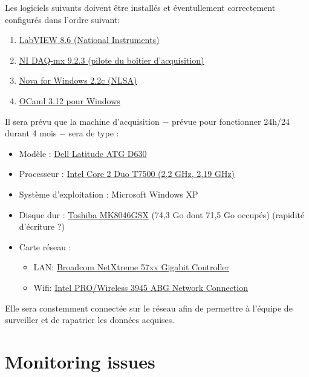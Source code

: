 \documentclass[a4paper]{report}
\begin{document}
Les logiciels suivants doivent \^etre install\'es et \'eventullement correctement configur\'es dans l'ordre\cite{NI_driver} suivant:
\begin{enumerate}
  \item{\href{http://digital.ni.com/src.nsf/websearch/968B3DF8AD48394D86257880005141A8?OpenDocument&node=node=203014_us}{LabVIEW 8.6 (National Instruments)}}
  \item{\href{http://joule.ni.com/nidu/cds/view/p/id/2260/lang/fr}{NI DAQ-mx 9.2.3 (pilote du bo\^itier d'acquisition)}}
  \item{\href{http://www.nlsa.com/uploads/nfw21v/nova_21v_download.html}{Nova for Windows 2.2c (NLSA)}}
  \item{\href{http://protz.github.com/ocaml-installer/}{OCaml 3.12 pour Windows}}
\end{enumerate}

Il sera pr\'evu que la machine d'acquisition $-$ pr\'evue pour fonctionner 24h/24 durant 4 mois $-$ sera de type :
\begin{itemize}
  \item{Mod\`ele : \href{http://support.dell.com/support/edocs/systems/latd630a/en/sm/index.htm}{Dell Latitude ATG D630}}
  \item{Processeur : \href{http://ark.intel.com/products/29761/Intel-Core2-Duo-Processor-T7500-\%284M-Cache-2_20-GHz-800-MHz-FSB\%29}{Intel Core 2 Duo T7500 (2,2 GHz, 2,19 GHz)}}
  \item{Syst\`eme d'exploitation : Microsoft Windows XP}
  \item{Disque dur : \href{http://storage.toshiba.com/storagesolutions/archived-models/mk8046gsx}{Toshiba MK8046GSX} (74,3 Go dont 71,5 Go occup\'es) (rapidit\'e d'\'ecriture ?)}
  \item{Carte r\'eseau :
    \begin{itemize}
      \item{LAN: \href{http://www.broadcom.com/support/ethernet_nic/netlink_k57.php}{Broadcom NetXtreme 57xx Gigabit Controller}}
      \item{Wifi: \href{http://www.intel.com/products/wireless/prowireless_mobile.htm}{Intel PRO/Wireless 3945 ABG Network Connection}}
    \end{itemize}
  }
\end{itemize}

Elle sera constemment connect\'ee sur le r\'eseau afin de permettre \`a l'\'equipe de surveiller et de rapatrier les donn\'ees acquises.

\section{Monitoring issues}
\end{document}
